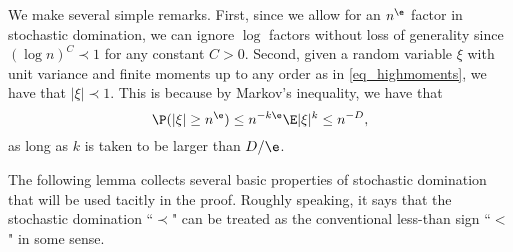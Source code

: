 \documentclass[aos,preprint]{imsart}
\begin{document}
%

\begin{remark}We make several simple remarks.
First, since we allow for an $n^\e$ factor in stochastic domination, we can ignore $\log$ factors without loss of generality since $(\log n)^C\prec 1$ for any constant $C>0$.
Second, given a random variable $\xi$ with unit variance and finite moments up to any order as in \eqref{eq_highmoments}, we have that $|\xi|\prec 1$.
This is because by Markov's inequality, we have that
$$ \P(|\xi|\ge n^{\e})\le n^{-k\e}{\E |\xi|^k}\le n^{-D},$$
as long as $k$ is taken to be larger than $D/ \e$.
\end{remark}

The following lemma collects several basic properties of  stochastic domination that will be used tacitly in the proof. Roughly speaking, it says that the stochastic domination ``$\prec$" can be treated as  the conventional less-than sign ``$<$" in some sense.
\end{document}
